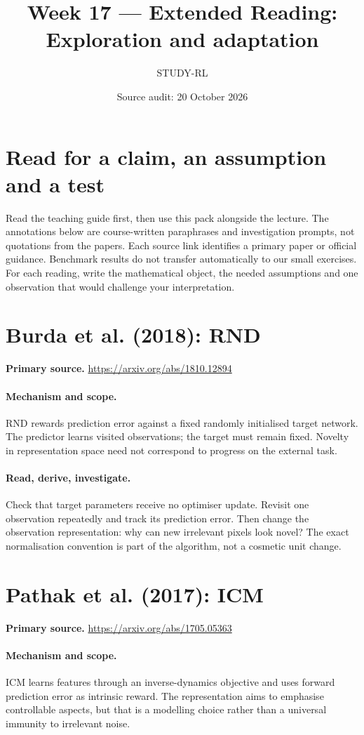 \documentclass[11pt]{scrartcl}
\title{Week 17 --- Extended Reading: Exploration and adaptation}
\author{STUDY-RL}
\date{Source audit: 20 October 2026}
\begin{document}
\maketitle
\section*{Read for a claim, an assumption and a test}
Read the teaching guide first, then use this pack alongside the lecture.
The annotations below are course-written paraphrases and investigation prompts,
not quotations from the papers. Each source link identifies a primary paper
or official guidance. Benchmark results do not transfer automatically to our
small exercises. For each reading, write the mathematical object, the needed
assumptions and one observation that would challenge your interpretation.

\section{Burda et al. (2018): RND}
\noindent\textbf{Primary source.} \url{https://arxiv.org/abs/1810.12894}

\paragraph{Mechanism and scope.} RND rewards prediction error against a fixed randomly initialised target network. The predictor learns visited observations; the target must remain fixed. Novelty in representation space need not correspond to progress on the external task.

\paragraph{Read, derive, investigate.} Check that target parameters receive no optimiser update. Revisit one observation repeatedly and track its prediction error. Then change the observation representation: why can new irrelevant pixels look novel? The exact normalisation convention is part of the algorithm, not a cosmetic unit change.

\section{Pathak et al. (2017): ICM}
\noindent\textbf{Primary source.} \url{https://arxiv.org/abs/1705.05363}

\paragraph{Mechanism and scope.} ICM learns features through an inverse-dynamics objective and uses forward prediction error as intrinsic reward. The representation aims to emphasise controllable aspects, but that is a modelling choice rather than a universal immunity to irrelevant noise.
\end{document}
